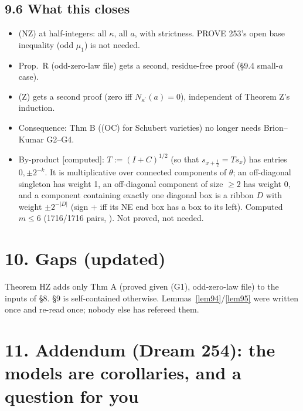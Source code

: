 \documentclass[10pt]{amsart}
\newcommand{\file}[1]{{\footnotesize\texttt{\detokenize{#1}}}}
\newcommand{\grade}[1]{\textsf{[#1]}}
\newcommand{\pr}{^{\prime}}
\theoremstyle{remark}
\begin{document}
\subsection*{9.6 What this closes}

\begin{itemize}
\item (NZ) at half-integers: all $\kappa$, all $a$, with strictness. PROVE 253's open base inequality (odd $\mu_1$) is not
needed.
\item Prop.~R (odd-zero-law file) gets a second, residue-free proof (\S9.4 small-$a$ case).
\item (Z) gets a second proof (zero iff $N_{\kappa\pr}(a)=0$), independent of Theorem Z's induction.
\item Consequence: Thm B ((OC) for Schubert varieties) no longer needs Brion--Kumar G2--G4.
\item By-product \grade{computed}: $T:=(I+C)^{1/2}$ (so that $s_{x+\frac12}=Ts_x$) has entries $0,\pm2^{-k}$. It is
multiplicative over connected components of $\theta$; an off-diagonal singleton has weight 1, an off-diagonal component of
size $\ge2$ has weight 0, and a component containing exactly one diagonal box is a ribbon $D$ with weight $\pm2^{-|D|}$
(sign $+$ iff its NE end box has a box to its left). Computed $m\le6$ (1716/1716 pairs, \file{tprime.py}). Not proved, not
needed.
\end{itemize}

\section*{10. Gaps (updated)}

Theorem HZ adds only Thm A (proved given (G1), odd-zero-law file) to the inputs of \S8. \S9 is self-contained otherwise.
Lemmas~\ref{lem94}/\ref{lem95} were written once and re-read once; nobody else has refereed them.

\section*{11. Addendum (Dream 254): the models are corollaries, and a question for you}
\end{document}
